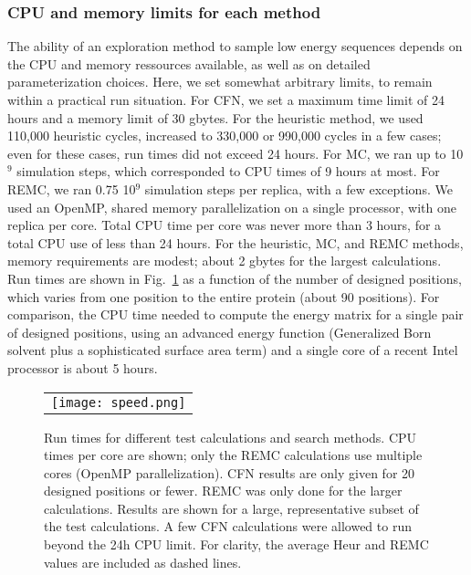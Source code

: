 {{\subsubsection{CPU and memory limits for each method}
\label{BESTprotocol}
The ability of an exploration method to sample low energy sequences depends on the CPU and memory ressources
available, as well as on detailed parameterization choices. Here, we set somewhat arbitrary limits, to remain
within a practical run situation. For CFN, we set a maximum time limit of 24 hours and a memory limit of 30
gbytes. For the heuristic method, we used 110,000 heuristic cycles, increased to 330,000 or 990,000 cycles in a
few cases; even for these cases, run times did not exceed 24 hours. For MC, we ran up to 10$^9$ simulation steps,
which corresponded to CPU times of 9 hours at most. For REMC, we ran 0.75 10$^9$ simulation steps per replica,
with a few exceptions. We used an OpenMP, shared memory parallelization on a single processor, with one replica
per core. Total CPU time per core was never more than 3 hours, for a total CPU use of less than 24 hours. For the
heuristic, MC, and REMC methods, memory requirements are modest; about 2 gbytes for the largest calculations. Run
times are shown in Fig.\ \ref{fig:cpu} as a function of the number of designed positions, which varies from
one position to the entire protein (about 90 positions). For comparison, the CPU time needed to compute the
energy matrix for a single pair of designed positions, using an advanced energy function (Generalized Born
solvent plus a sophisticated surface area term) and a single core of a recent Intel processor is about 5 hours.


    \begin{figure}[!htbp]
      \centering
      \begin{tabular}{c}
        \texttt{[image: speed.png]} 
      \end{tabular}
      \caption{\small 
Run times for different test calculations and search methods. CPU times per core are
shown; only the REMC calculations use multiple cores (OpenMP parallelization). CFN results
are only given for 20 designed positions or fewer. REMC was only done for the larger
calculations. Results are shown for a large, representative subset of the test calculations.
A few CFN calculations were allowed to run beyond the 24h CPU limit. For clarity, the
average Heur and REMC values are included as dashed lines.
}

      \label{fig:cpu}
    \end{figure}



}}
